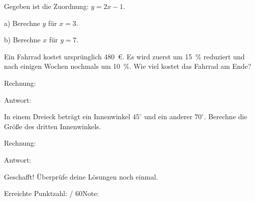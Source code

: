 \documentclass[theme=modern,subject=Mathematik,grade=8. Klasse,number=2]{schoolexam}
\begin{document}
\begin{examtask}[title={Zuordnungen und Funktionen},points=4]
Gegeben ist die Zuordnung: $y=2x-1$.\par\medskip
a) Berechne $y$ für $x=3$. \hfill \answerline[7cm]\par\medskip
b) Berechne $x$ für $y=7$. \hfill \answerline[7cm]
\end{examtask}

\examnewpage

\begin{examtask}[title={Textaufgabe},points=6]
Ein Fahrrad kostet ursprünglich 480~€. Es wird zuerst um 15~\% reduziert und nach
einigen Wochen nochmals um 10~\%. Wie viel kostet das Fahrrad am Ende?\par\medskip
Rechnung:\par\smallskip
{}\par\medskip
Antwort: \answerline[8cm]
\end{examtask}

\begin{examtask}[title={Geometrie -- Winkel},points=4]
In einem Dreieck beträgt ein Innenwinkel $45^\circ$ und ein anderer $70^\circ$.
Berechne die Größe des dritten Innenwinkels.\par\medskip
Rechnung:\par\smallskip
{}\par\medskip
Antwort: \answerline[8cm]
\end{examtask}

\vfill
\begin{schoolSoftBox}[colback=schoolSoft,colframe=schoolSoft,arc=2.5mm]{\faTrophy\hspace{2mm}Geschafft!}
Überprüfe deine Lösungen noch einmal.\par\smallskip
Erreichte Punktzahl: \answerline[18mm] / 60\hfill Note: \answerline[24mm]
\end{schoolSoftBox}
\end{document}
